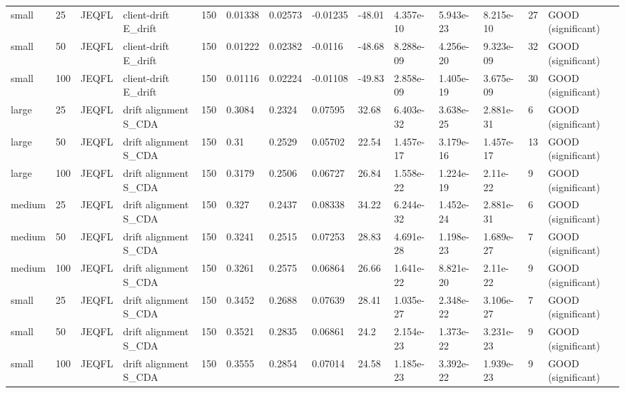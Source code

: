 \begin{table}[t]
\begin{tabular}{llllllllllllll}
small & 25 & JEQFL & client-drift E\_drift & 150 & 0.01338 & 0.02573 & -0.01235 & -48.01 & 4.357e-10 & 5.943e-23 & 8.215e-10 & 27 & GOOD (significant) \\
small & 50 & JEQFL & client-drift E\_drift & 150 & 0.01222 & 0.02382 & -0.0116 & -48.68 & 8.288e-09 & 4.256e-20 & 9.323e-09 & 32 & GOOD (significant) \\
small & 100 & JEQFL & client-drift E\_drift & 150 & 0.01116 & 0.02224 & -0.01108 & -49.83 & 2.858e-09 & 1.405e-19 & 3.675e-09 & 30 & GOOD (significant) \\
large & 25 & JEQFL & drift alignment S\_CDA & 150 & 0.3084 & 0.2324 & 0.07595 & 32.68 & 6.403e-32 & 3.638e-25 & 2.881e-31 & 6 & GOOD (significant) \\
large & 50 & JEQFL & drift alignment S\_CDA & 150 & 0.31 & 0.2529 & 0.05702 & 22.54 & 1.457e-17 & 3.179e-16 & 1.457e-17 & 13 & GOOD (significant) \\
large & 100 & JEQFL & drift alignment S\_CDA & 150 & 0.3179 & 0.2506 & 0.06727 & 26.84 & 1.558e-22 & 1.224e-19 & 2.11e-22 & 9 & GOOD (significant) \\
medium & 25 & JEQFL & drift alignment S\_CDA & 150 & 0.327 & 0.2437 & 0.08338 & 34.22 & 6.244e-32 & 1.452e-24 & 2.881e-31 & 6 & GOOD (significant) \\
medium & 50 & JEQFL & drift alignment S\_CDA & 150 & 0.3241 & 0.2515 & 0.07253 & 28.83 & 4.691e-28 & 1.198e-23 & 1.689e-27 & 7 & GOOD (significant) \\
medium & 100 & JEQFL & drift alignment S\_CDA & 150 & 0.3261 & 0.2575 & 0.06864 & 26.66 & 1.641e-22 & 8.821e-20 & 2.11e-22 & 9 & GOOD (significant) \\
small & 25 & JEQFL & drift alignment S\_CDA & 150 & 0.3452 & 0.2688 & 0.07639 & 28.41 & 1.035e-27 & 2.348e-22 & 3.106e-27 & 7 & GOOD (significant) \\
small & 50 & JEQFL & drift alignment S\_CDA & 150 & 0.3521 & 0.2835 & 0.06861 & 24.2 & 2.154e-23 & 1.373e-22 & 3.231e-23 & 9 & GOOD (significant) \\
small & 100 & JEQFL & drift alignment S\_CDA & 150 & 0.3555 & 0.2854 & 0.07014 & 24.58 & 1.185e-23 & 3.392e-22 & 1.939e-23 & 9 & GOOD (significant) \\
\bottomrule
\end{tabular}
\end{table}